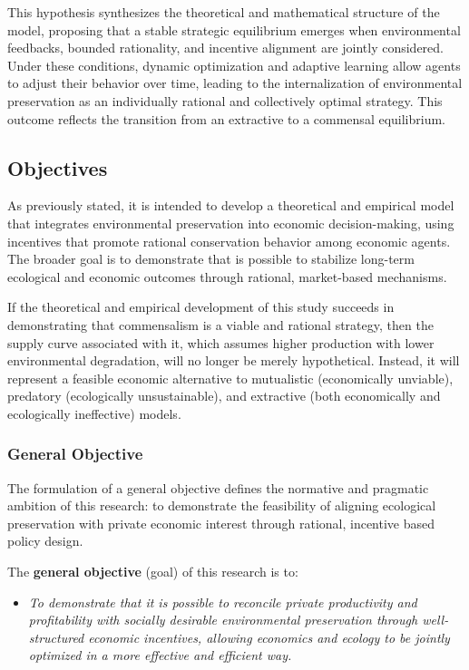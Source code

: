 This hypothesis synthesizes the theoretical and mathematical structure of the model, proposing that a stable strategic equilibrium emerges when environmental feedbacks, bounded rationality, and incentive alignment are jointly considered. Under these conditions, dynamic optimization and adaptive learning allow agents to adjust their behavior over time, leading to the internalization of environmental preservation as an individually rational and collectively optimal strategy. This outcome reflects the transition from an extractive to a commensal equilibrium.

\subsection{Objectives}

As previously stated, it is intended to develop a theoretical and empirical model that integrates environmental preservation into economic decision-making, using incentives that promote rational conservation behavior among economic agents. The broader goal is to demonstrate that is possible to stabilize long-term ecological and economic outcomes through rational, market-based mechanisms.

If the theoretical and empirical development of this study succeeds in demonstrating that commensalism is a viable and rational strategy, then the supply curve associated with it, which assumes higher production with lower environmental degradation, will no longer be merely hypothetical. Instead, it will represent a feasible economic alternative to mutualistic (economically unviable), predatory (ecologically unsustainable), and extractive (both economically and ecologically ineffective) models. 

\subsubsection{General Objective}

The formulation of a general objective defines the normative and pragmatic ambition of this research: to demonstrate the feasibility of aligning ecological preservation with private economic interest through rational, incentive based policy design.

\vspace{1em}

The \textbf{general objective} (goal) of this research is to:

\begin{itemize}

    \item[\textbf{G0.}]
    
    \textit{To demonstrate that it is possible to reconcile private productivity and profitability with socially desirable environmental preservation through well-structured economic incentives, allowing economics and ecology to be jointly optimized in a more effective and efficient way.}
    
\end{itemize}

